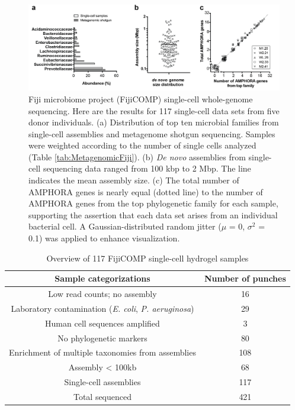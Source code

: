 \begin{figure}
\centering
\includegraphics[keepaspectratio,width=1\textwidth]{./figures/Thesis-23.png}
\caption[Fiji microbiome project (FijiCOMP) single-cell whole-genome sequencing.]{Fiji microbiome project (FijiCOMP) single-cell whole-genome sequencing. Here are the results for 117 single-cell data sets from five donor individuals. (a) Distribution of top ten microbial families from single-cell assemblies and metagenome shotgun sequencing. Samples were weighted according to the number of single cells analyzed (Table \ref{tab:MetagenomicFiji}). (b) \textit{De novo} assemblies from single-cell sequencing data ranged from 100 kbp to 2 Mbp. The line indicates the mean assembly size. (c) The total number of AMPHORA genes is nearly equal (dotted line) to the number of AMPHORA genes from the top phylogenetic family for each sample, supporting the assertion that each data set arises from an individual bacterial cell. A Gaussian-distributed random jitter ($\mu$ = 0, $\sigma^{2}$ = 0.1) was applied to enhance visualization.}
\label{fig:Amphora}
\end{figure}

\begin{table}[h]
\centering 
\caption{Overview of 117 FijiCOMP single-cell hydrogel samples}
\label{tab:Fiji117cells}
\begin{adjustbox}{max width=\textwidth}
\begin{tabular}{c|c}
\hline 
Sample categorizations & Number of punches \\
\hline\hline
Low read counts; no assembly & 16 \\
Laboratory contamination (\textit{E. coli}, \textit{P. aeruginosa}) & 29 \\
Human cell sequences amplified & 3 \\
No phylogenetic markers & 80 \\
Enrichment of multiple taxonomies from assemblies & 108 \\
Assembly < 100kb & 68 \\
\hline
\cellcolor{lightgray}Single-cell assemblies & \cellcolor{lightgray}117 \\
\hline
Total sequenced & 421 \\ \hline
\end{tabular}
\end{adjustbox}
\end{table}

